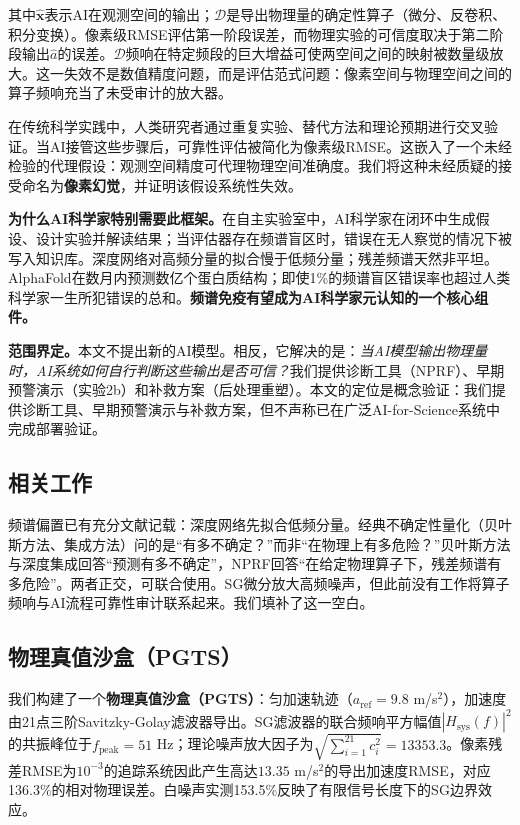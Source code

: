 \documentclass[9pt,twocolumn]{article}
\theoremstyle{remark}
\theoremstyle{definition}
\newcommand{\hsysf}{|H_{\text{sys}}(f)|^2}
\newcommand{\澔}{%
  \hbox{%
    \scalebox{0.75}[1]{氵}%
    \kern -0.3em%
    \scalebox{0.8}[1]{皓}%
  }%
}
\begin{document}
其中$\hat{\mathbf{x}}$表示AI在观测空间的输出；$\mathcal{D}$是导出物理量的确定性算子（微分、反卷积、积分变换）。像素级RMSE评估第一阶段误差，而物理实验的可信度取决于第二阶段输出$\hat{a}$的误差。$\mathcal{D}$频响在特定频段的巨大增益可使两空间之间的映射被数量级放大。这一失效不是数值精度问题，而是评估范式问题：像素空间与物理空间之间的算子频响充当了未受审计的放大器。

在传统科学实践中，人类研究者通过重复实验、替代方法和理论预期进行交叉验证。当AI接管这些步骤后，可靠性评估被简化为像素级RMSE。这嵌入了一个未经检验的代理假设：观测空间精度可代理物理空间准确度。我们将这种未经质疑的接受命名为\textbf{像素幻觉}，并证明该假设系统性失效。

\textbf{为什么AI科学家特别需要此框架。}在自主实验室\cite{burger2020}中，AI科学家在闭环中生成假设、设计实验并解读结果；当评估器存在频谱盲区时，错误在无人察觉的情况下被写入知识库。深度网络对高频分量的拟合慢于低频分量\cite{xu2019,rahaman2019,tancik2020,ronen2019}；残差频谱天然非平坦。AlphaFold\cite{abramson2024}在数月内预测数亿个蛋白质结构；即使1\%的频谱盲区错误率也超过人类科学家一生所犯错误的总和。\textbf{频谱免疫有望成为AI科学家元认知的一个核心组件。}

\textbf{范围界定。}本文不提出新的AI模型。相反，它解决的是：\textit{当AI模型输出物理量时，AI系统如何自行判断这些输出是否可信？}我们提供诊断工具（NPRF）、早期预警演示（实验2b）和补救方案（后处理重塑）。本文的定位是概念验证：我们提供诊断工具、早期预警演示与补救方案，但不声称已在广泛AI-for-Science系统中完成部署验证。

\subsection{相关工作}

频谱偏置已有充分文献记载：深度网络先拟合低频分量\cite{rahaman2019,xu2019,tancik2020,ronen2019}。经典不确定性量化（贝叶斯方法\cite{kendall2017}、集成方法\cite{lakshminarayanan2017}）问的是“有多不确定？”而非“在物理上有多危险？”贝叶斯方法与深度集成回答“预测有多不确定”，NPRF回答“在给定物理算子下，残差频谱有多危险”。两者正交，可联合使用。SG微分\cite{savitzky1964}放大高频噪声，但此前没有工作将算子频响与AI流程可靠性审计联系起来。我们填补了这一空白。

\subsection{物理真值沙盒（PGTS）}

我们构建了一个\textbf{物理真值沙盒（PGTS）}：匀加速轨迹（$a_{\text{ref}}=9.8$ m/s$^2$），加速度由21点三阶Savitzky-Golay滤波器\cite{savitzky1964}导出。SG滤波器的联合频响平方幅值$\hsysf$的共振峰位于$f_{\text{peak}}=51$ Hz；理论噪声放大因子为$\sqrt{\sum_{i=1}^{21} c_i^2}=13353.3$。像素残差RMSE为$10^{-3}$的追踪系统因此产生高达$13.35$ m/s$^2$的导出加速度RMSE，对应136.3\%的相对物理误差。白噪声实测153.5\%反映了有限信号长度下的SG边界效应。
\end{document}
